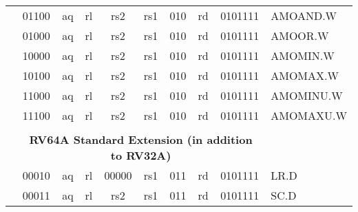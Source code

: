 \begin{table}[p]
\begin{small}
\begin{center}
\begin{tabular}{p{0in}p{0.4in}p{0.05in}p{0.05in}p{0.05in}p{0.05in}p{0.4in}p{0.6in}p{0.4in}p{0.6in}p{0.7in}l}
&
\multicolumn{2}{|c|}{01100} &
\multicolumn{1}{c|}{aq} &
\multicolumn{1}{c|}{rl} &
\multicolumn{2}{c|}{rs2} &
\multicolumn{1}{c|}{rs1} &
\multicolumn{1}{c|}{010} &
\multicolumn{1}{c|}{rd} &
\multicolumn{1}{c|}{0101111} & AMOAND.W \\
\cline{2-11}
  

&
\multicolumn{2}{|c|}{01000} &
\multicolumn{1}{c|}{aq} &
\multicolumn{1}{c|}{rl} &
\multicolumn{2}{c|}{rs2} &
\multicolumn{1}{c|}{rs1} &
\multicolumn{1}{c|}{010} &
\multicolumn{1}{c|}{rd} &
\multicolumn{1}{c|}{0101111} & AMOOR.W \\
\cline{2-11}
  

&
\multicolumn{2}{|c|}{10000} &
\multicolumn{1}{c|}{aq} &
\multicolumn{1}{c|}{rl} &
\multicolumn{2}{c|}{rs2} &
\multicolumn{1}{c|}{rs1} &
\multicolumn{1}{c|}{010} &
\multicolumn{1}{c|}{rd} &
\multicolumn{1}{c|}{0101111} & AMOMIN.W \\
\cline{2-11}
  

&
\multicolumn{2}{|c|}{10100} &
\multicolumn{1}{c|}{aq} &
\multicolumn{1}{c|}{rl} &
\multicolumn{2}{c|}{rs2} &
\multicolumn{1}{c|}{rs1} &
\multicolumn{1}{c|}{010} &
\multicolumn{1}{c|}{rd} &
\multicolumn{1}{c|}{0101111} & AMOMAX.W \\
\cline{2-11}
  

&
\multicolumn{2}{|c|}{11000} &
\multicolumn{1}{c|}{aq} &
\multicolumn{1}{c|}{rl} &
\multicolumn{2}{c|}{rs2} &
\multicolumn{1}{c|}{rs1} &
\multicolumn{1}{c|}{010} &
\multicolumn{1}{c|}{rd} &
\multicolumn{1}{c|}{0101111} & AMOMINU.W \\
\cline{2-11}
  

&
\multicolumn{2}{|c|}{11100} &
\multicolumn{1}{c|}{aq} &
\multicolumn{1}{c|}{rl} &
\multicolumn{2}{c|}{rs2} &
\multicolumn{1}{c|}{rs1} &
\multicolumn{1}{c|}{010} &
\multicolumn{1}{c|}{rd} &
\multicolumn{1}{c|}{0101111} & AMOMAXU.W \\
\cline{2-11}
  

&
\multicolumn{10}{c}{} & \\
&
\multicolumn{10}{c}{\bf RV64A Standard Extension (in addition to RV32A)} & \\
\cline{2-11}
  

&
\multicolumn{2}{|c|}{00010} &
\multicolumn{1}{c|}{aq} &
\multicolumn{1}{c|}{rl} &
\multicolumn{2}{c|}{00000} &
\multicolumn{1}{c|}{rs1} &
\multicolumn{1}{c|}{011} &
\multicolumn{1}{c|}{rd} &
\multicolumn{1}{c|}{0101111} & LR.D \\
\cline{2-11}
  

&
\multicolumn{2}{|c|}{00011} &
\multicolumn{1}{c|}{aq} &
\multicolumn{1}{c|}{rl} &
\multicolumn{2}{c|}{rs2} &
\multicolumn{1}{c|}{rs1} &
\multicolumn{1}{c|}{011} &
\multicolumn{1}{c|}{rd} &
\multicolumn{1}{c|}{0101111} & SC.D \\
\cline{2-11}
  


\end{tabular}
\end{center}
\end{small}
\end{table}
